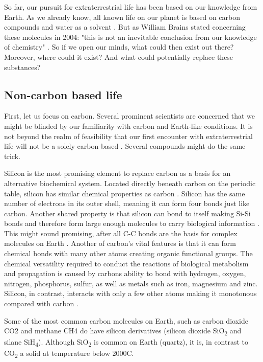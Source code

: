 So far, our pursuit for extraterrestrial life has been based on our knowledge from Earth.
As we already know, all known life on our planet is based on carbon compounds and water as a solvent \cite{OForm2}.
But as William Brains stated concerning these molecules in 2004: "this is not an inevitable conclusion from our knowledge of chemistry" \cite{OForm1}.
So if we open our minds, what could then exist out there?
Moreover, where could it exist?
And what could potentially replace these substances?

\subsection*{Non-carbon based life}

First, let us focus on carbon. Several prominent scientists are concerned that we might be blinded by our familiarity with carbon and Earth-like conditions.
It is not beyond the realm of feasibility that our first encounter with extraterrestrial life will not be a solely carbon-based \cite{OForm3}.
Several compounds might do the same trick.

Silicon is the most promising element to replace carbon as a basis for an alternative biochemical system. 
Located directly beneath carbon on the periodic table, silicon has similar chemical properties as carbon \cite{OForm4}.
Silicon has the same number of electrons in its outer shell, meaning it can form four bonds just like carbon.
Another shared property is that silicon can bond to itself making Si-Si bonds and therefore form large enough molecules to carry biological information \cite{OForm5}.
This might sound promising, after all C-C bonds are the basis for complex molecules on Earth \cite{OForm4}.
Another of carbon's vital features is that it can form chemical bonds with many other atoms creating organic functional groups.
The chemical versatility required to conduct the reactions of biological metabolism and propagation is caused by carbons ability to bond with hydrogen, oxygen, nitrogen, phosphorus, sulfur, as well as metals such as iron, magnesium and zinc.
Silicon, in contrast, interacts with only a few other atoms making it monotonous compared with carbon \cite{OForm5}.

Some of the most common carbon molecules on Earth, such as carbon dioxide CO2 and methane CH4 do have silicon derivatives (silicon dioxide SiO\textsubscript{2} and silane SiH\textsubscript{4}).
Although SiO\textsubscript{2} is common on Earth (quartz), it is, in contrast to CO\textsubscript{2} a solid at temperature below 2000\degree C.

